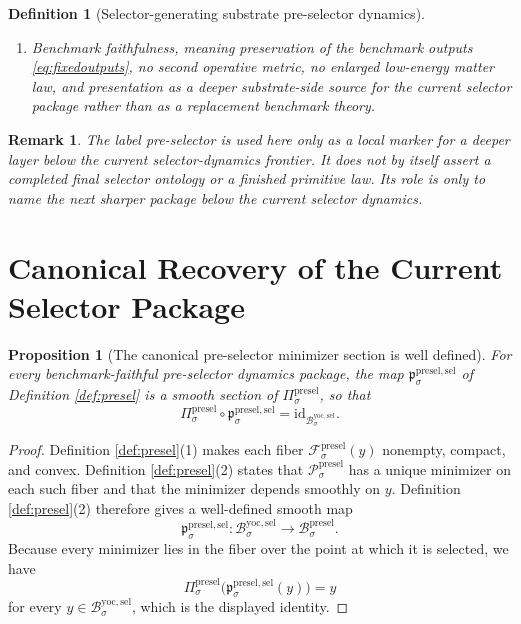 \documentclass[11pt]{article}
\newcommand{\YoctoSelectorBody}[1]{\mathcal B_{#1}^{\mathrm{yoc,sel}}}
\newcommand{\YoctoSelectorShell}[1]{\mathcal Z_{#1}^{\mathrm{yoc,sel}}}
\newcommand{\PreSelectorBody}[1]{\mathcal B_{#1}^{\mathrm{presel}}}
\newcommand{\PreSelectorProj}[1]{\Pi_{#1}^{\mathrm{presel}}}
\newcommand{\PreSelectorFiber}[2]{\mathcal F_{#1}^{\mathrm{presel}}(#2)}
\newcommand{\PreSelectorFunctional}[1]{\mathscr P_{#1}^{\mathrm{presel}}}
\newcommand{\PreSelectorSelectorMin}[1]{\mathfrak p_{#1}^{\mathrm{presel,sel}}}
\newcommand{\PreSelectorShell}[1]{\mathcal Z_{#1}^{\mathrm{presel}}}
\newtheorem{definition}{Definition}
\newtheorem{proposition}{Proposition}
\newtheorem{remark}{Remark}
\begin{document}
\begin{definition}[Selector-generating substrate pre-selector dynamics]
\begin{enumerate}
\[\begin{array}{l}
    \PreSelectorFunctional{\sigma}(u)
    =
    \displaystyle\min_{v\in\PreSelectorFiber{\sigma}{\PreSelectorProj{\sigma}(u)}}
    \PreSelectorFunctional{\sigma}(v)
    \end{array}
    \right\},
    \]
    and
    \[
    \PreSelectorProj{\sigma}\big|_{\PreSelectorShell{\sigma}}
    :
    \PreSelectorShell{\sigma}\xrightarrow{\cong}\YoctoSelectorShell{\sigma}
    \]
    is a diffeomorphism.
    \item Benchmark faithfulness, meaning preservation of the benchmark outputs \eqref{eq:fixedoutputs}, no second operative metric, no enlarged low-energy matter law, and presentation as a deeper substrate-side source for the current selector package rather than as a replacement benchmark theory.
\end{enumerate}
\end{definition}

\begin{remark}
The label \emph{pre-selector} is used here only as a local marker for a deeper layer below the current selector-dynamics frontier. It does not by itself assert a completed final selector ontology or a finished primitive law. Its role is only to name the next sharper package below the current selector dynamics.
\end{remark}

\section{Canonical Recovery of the Current Selector Package}

\begin{proposition}[The canonical pre-selector minimizer section is well defined]
\label{prop:section}
For every benchmark-faithful pre-selector dynamics package, the map \(\PreSelectorSelectorMin{\sigma}\) of Definition \ref{def:presel} is a smooth section of \(\PreSelectorProj{\sigma}\), so that
\[
\PreSelectorProj{\sigma}\circ\PreSelectorSelectorMin{\sigma}
=
\mathrm{id}_{\YoctoSelectorBody{\sigma}}.
\]
\end{proposition}

\begin{proof}
Definition \ref{def:presel}(1) makes each fiber \(\PreSelectorFiber{\sigma}{y}\) nonempty, compact, and convex. Definition \ref{def:presel}(2) states that \(\PreSelectorFunctional{\sigma}\) has a unique minimizer on each such fiber and that the minimizer depends smoothly on \(y\). Definition \ref{def:presel}(2) therefore gives a well-defined smooth map
\[
\PreSelectorSelectorMin{\sigma}:\YoctoSelectorBody{\sigma}\to\PreSelectorBody{\sigma}.
\]
Because every minimizer lies in the fiber over the point at which it is selected, we have
\[
\PreSelectorProj{\sigma}\bigl(\PreSelectorSelectorMin{\sigma}(y)\bigr)=y
\]
for every \(y\in\YoctoSelectorBody{\sigma}\), which is the displayed identity.
\end{proof}
\end{document}
